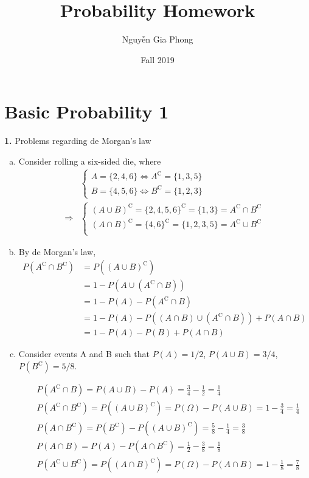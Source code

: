 \documentclass[a4paper,12pt]{article}
\title{Probability Homework}
\author{Nguyễn Gia Phong}
\date{Fall 2019}
\newcommand{\C}{\mathrm C}
\newcommand{\exercise}[1]{\noindent\textbf{#1.}}
\begin{document}
\maketitle
\section{Basic Probability 1}

\exercise 1  Problems regarding de Morgan's law
\begin{enumerate}[(a)]
  \item Consider rolling a six-sided die, where
    \begin{align*}
      &\begin{cases}
        A = \{2, 4, 6\}\iff A^\C = \{1, 3, 5\}\\
        B = \{4, 5, 6\}\iff B^\C = \{1, 2, 3\}
      \end{cases}\\
      \Longrightarrow &\begin{cases}
        (A \cup B)^\C = \{2, 4, 5, 6\}^\C = \{1, 3\} = A^\C \cap B^\C\\
        (A \cap B)^\C = \{4, 6\}^\C = \{1, 2, 3, 5\} = A^\C \cup B^\C\\
      \end{cases}
    \end{align*}
  \item By de Morgan's law,
    \begin{align*}
      P\left(A^\C \cap B^\C\right) &= P\left((A \cup B)^\C\right)\\
      &= 1 - P\left(A \cup \left(A^\C \cap B\right)\right)\\
      &= 1 - P(A) - P\left(A^\C \cap B\right)
      \tag{since $A \cap \left(A^\C \cap B\right) = \varnothing$}\\
      &= 1 -P(A) -P\left((A\cap B)\cup\left(A^\C\cap B\right)\right) +P(A\cap B)
      \tag{since $(A\cap B)\cap\left(A^\C\cap B\right) = \varnothing$}\\
      &= 1 - P(A) - P(B) + P(A\cap B)
    \end{align*}\label{1.b}
  \item Consider events A and B such that $P(A) = 1/2$, $P(A\cup B) = 3/4$,
    $P\left(B^\C\right) = 5/8$.

    \begin{align*}
      & P\left(A^\C\cap B\right) = P(A\cup B) - P(A)
      = \frac 3 4 - \frac 1 2 = \frac 1 4\\
      & P\left(A^\C\cap B^\C\right) = P\left((A\cup B)^\C\right)
      = P(\Omega) - P(A\cup B) = 1 - \frac 3 4 = \frac 1 4\\
      & P\left(A\cap B^\C\right) = P\left(B^\C\right)-P\left((A\cup B)^\C\right)
      = \frac 5 8 - \frac 1 4 = \frac 3 8\\
      & P(A\cap B) = P(A) - P\left(A\cap B^\C\right)
      = \frac 1 2 - \frac 3 8 = \frac 1 8\\
      & P\left(A^\C\cup B^\C\right) = P\left((A\cap B)^\C\right)
      = P(\Omega) - P(A\cap B) = 1 - \frac 1 8 = \frac 7 8
    \end{align*}
\end{enumerate}
\end{document}
